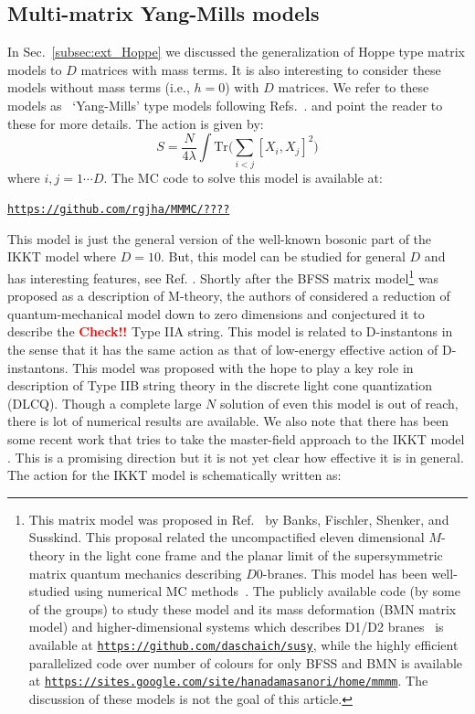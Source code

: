 \documentclass[11pt]{article}
\newcommand{\TODO}[1]{\textcolor{red}{{\bf #1}}}
\begin{document}
\subsection{Multi-matrix Yang-Mills models}
In Sec.~\ref{subsec:ext_Hoppe} we discussed the generalization of Hoppe type matrix models to $D$ matrices
with mass terms. It is also interesting to consider these models without mass terms (i.e., $h=0$) with $D$ matrices. 
We refer to these models as ~`Yang-Mills' type models following Refs.~\cite{Krauth:1998yu,Krauth:1999qw}. 
and point the reader to these for more details. The action is given by: 
\begin{equation}
	\label{eq:CTmodel} 
S = \frac{N}{4\lambda} \int \mbox{Tr} \Bigg( \sum_{i < j}[X_i, X_j]^{2}\Bigg) 
\end{equation}
where $i, j = 1 \cdots D$. The MC code to solve this model is available at:
\begin{center} \texttt{\href{https://github.com/rgjha/MMMC/____}{https://github.com/rgjha/MMMC/????}} \end{center}
This model is just the general version of the well-known bosonic part of the IKKT model
where $D=10$. But, this model can be studied for general $D$ and has interesting features, see Ref. \cite{Hotta:1998en}. 
Shortly after the BFSS matrix model\footnote{This matrix model was proposed in Ref.~\cite{Banks:1996vh} by
Banks, Fischler, Shenker, and Susskind. This proposal related the 
uncompactified eleven dimensional $M$-theory in the light cone frame and the 
planar limit of the supersymmetric matrix quantum mechanics describing $D0$-branes. This model has been
well-studied using numerical MC methods~\cite{Catterall:2007fp,Hanada:2008ez,Filev:2015hia,Berkowitz:2016tyy}. 
The publicly available code (by some of the groups) to study these model and its mass deformation (BMN matrix model) and higher-dimensional systems which describes D1/D2 branes~\cite{Catterall:2017lub,Jha:2017zad,Catterall:2020nmn}
is available at \texttt{\href{https://github.com/daschaich/susy}{https://github.com/daschaich/susy}}, while the
highly efficient parallelized code over number of colours for only BFSS and BMN is available at
\texttt{\href{https://sites.google.com/site/hanadamasanori/home/mmmm}
{https://sites.google.com/site/hanadamasanori/home/mmmm}}.
The discussion of these models is not the goal of this article. 
}
was proposed as a description of M-theory, the authors of 
\cite{Ishibashi:1996xs} considered a reduction of quantum-mechanical model down to zero 
dimensions and conjectured it to describe the \TODO{Check!!} Type IIA string. This model is related to D-instantons in the sense that it has the same action as that of low-energy effective action of D-instantons. This model was proposed with the hope to play a key role in description of Type IIB string theory in the discrete light cone quantization (DLCQ). Though a complete large $N$ solution of even this model is out of reach, there is lot of numerical results are available. 
We also note that there has been some recent work that tries to take the master-field approach to the
IKKT model \cite{Klinkhamer:2021wrv}. This is a promising direction but it is not yet clear how effective 
it is in general. The action for the IKKT model is schematically written as:
\end{document}
